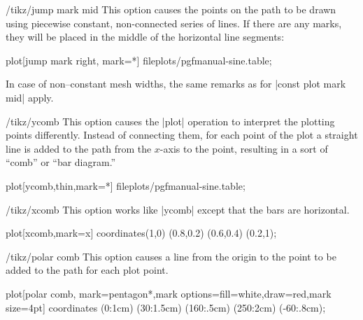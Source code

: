\begin{key}{/tikz/jump mark mid}
  This option causes the points on the path to be drawn using
  piecewise constant, non-connected series of lines. If there are any
  marks, they will be placed in the middle of the horizontal line
  segments: 

\begin{codeexample}[]
\tikz\draw plot[jump mark right, mark=*] file{plots/pgfmanual-sine.table};
\end{codeexample}

  In case of non--constant mesh widths, the same remarks as for |const plot mark mid| apply.
\end{key}

\begin{key}{/tikz/ycomb}
  This option causes the |plot| operation to interpret the plotting
  points differently. Instead of connecting them, for each point of
  the plot a straight line is added to the path from the $x$-axis to the point,
  resulting in a sort of ``comb'' or ``bar diagram.''

\begin{codeexample}[]
\tikz{} plot[ycomb,thin,mark=*] file{plots/pgfmanual-sine.table};
\end{codeexample}

\begin{codeexample}[]
\end{codeexample}
\end{key}


\begin{key}{/tikz/xcomb}
  This option works like |ycomb| except that the bars are horizontal.

\begin{codeexample}[]
\tikz \draw plot[xcomb,mark=x] coordinates{(1,0) (0.8,0.2) (0.6,0.4) (0.2,1)};
\end{codeexample}
\end{key}


\begin{key}{/tikz/polar comb}
  This option causes a line from the origin to the point to be added
  to the path for each plot point.

\begin{codeexample}[]
\tikz \draw plot[polar comb,
     mark=pentagon*,mark options={fill=white,draw=red},mark size=4pt]
   coordinates {(0:1cm) (30:1.5cm) (160:.5cm) (250:2cm) (-60:.8cm)};
\end{codeexample}
\end{key}

